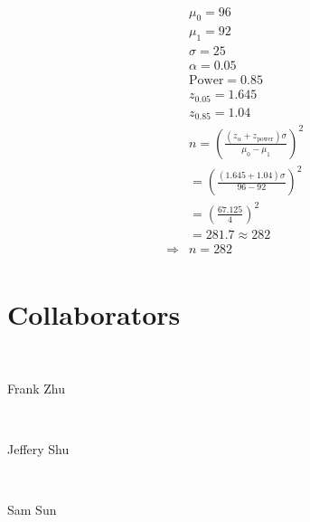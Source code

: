 \documentclass{article}
\begin{document}
~

\begin{align*}
    &\mu_0=96\\
    &\mu_1=92\\
    &\sigma=25\\
    &\alpha=0.05\\
    &\text{Power}=0.85\\
    &z_{0.05}=1.645\\
    &z_{0.85}=1.04\\
    &n=\left(\frac{(z_\alpha+z_{\text{power}})\sigma}{\mu_0-\mu_1}\right)^2\\
    &=\left(\frac{(1.645+1.04)\sigma}{96-92}\right)^2\\
    &=\left(\frac{67.125}{4}\right)^2\\
    &=281.7\approx282\\
    \Rightarrow&n=282\\
\end{align*}

\newpage

\section*{Collaborators}

~

Frank Zhu

~

Jeffery Shu

~

Sam Sun
\end{document}

